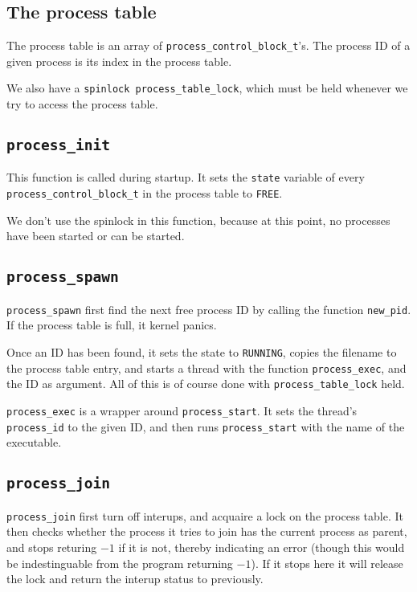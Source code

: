 \documentclass{article}
\begin{document}
\subsection{The process table}
The process table is an array of \texttt{process\_control\_block\_t}'s. The process ID of a given process is its index in the process table.

We also have a \texttt{spinlock process\_table\_lock}, which must be held whenever we try to access the process table.

\subsection{\texttt{process\_init}}
This function is called during startup. It sets the \texttt{state} variable of every \texttt{process\_control\_block\_t} in the process table to \texttt{FREE}.

We don't use the spinlock in this function, because at this point, no processes have been started or can be started.

\subsection{\texttt{process\_spawn}}
\texttt{process\_spawn} first find the next free process ID by calling the function \texttt{new\_pid}. If the process table is full, it kernel panics.

Once an ID has been found, it sets the state to \texttt{RUNNING}, copies the filename to the process table entry, and starts a thread with the function \texttt{process\_exec}, and the ID as argument. All of this is of course done with \texttt{process\_table\_lock} held.

\texttt{process\_exec} is a wrapper around \texttt{process\_start}. It sets the thread's \texttt{process\_id} to the given ID, and then runs \texttt{process\_start} with the name of the executable.

\subsection{\texttt{process\_join}}
\texttt{process_join} first turn off interups, and acquaire a lock on
the process table. It then checks whether the process it tries to join
has the current process as parent, and stops returing $-1$ if it is
not, thereby indicating an error (though this would be indestinguable from the
program returning $-1$). If it stops here it will release the lock and
return the interup status to previously.
\end{document}
